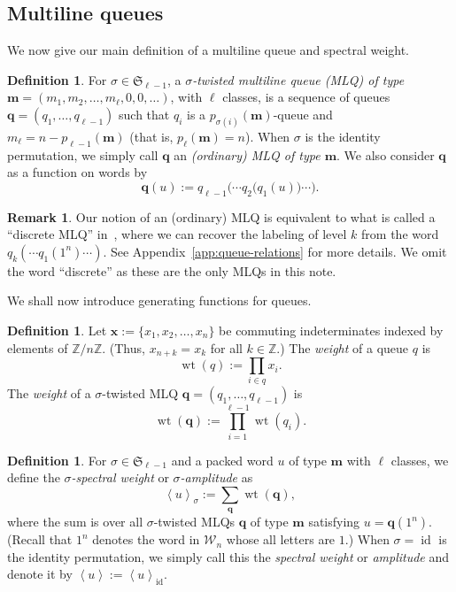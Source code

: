 \documentclass[reqno]{amsart}
\newcommand{\0}{\phantom{c}}
\newcommand{\swt}[1]{\left\langle #1 \right\rangle} %
\newcommand{\SymGp}[1]{\mathfrak{S}_{#1}} %
\DeclareMathOperator{\wt}{wt} %
\DeclareMathOperator{\id}{id} %
\newcommand{\mm}{\mathbf{m}}
\newcommand{\qq}{\mathbf{q}}
\newcommand{\xx}{\mathbf{x}}
\newcommand{\mcW}{\mathcal{W}}
\newcommand{\ZZ}{\mathbb{Z}}
\let\sumnonlimits\sum
\let\prodnonlimits\prod
\renewcommand{\sum}{\sumnonlimits\limits}
\renewcommand{\prod}{\prodnonlimits\limits}
\newcommand{\tup}[1]{\left( #1 \right)}
\newcommand{\defn}[1]{{\color{darkred}\emph{#1}}} %
\theoremstyle{plain}
\theoremstyle{definition}
\newtheorem{dfn}[thm]{Definition}
\newtheorem{remark}[thm]{Remark}
\numberwithin{equation}{section}
\begin{document}
\subsection{Multiline queues}

We now give our main definition of a multiline queue and spectral weight.

\begin{dfn}
For $\sigma \in \SymGp{\ell-1}$, a \defn{$\sigma$-twisted multiline queue (MLQ) of type $\mm = \tup{m_1, m_2, \ldots, m_\ell, 0, 0, \ldots}$}, with $\ell$ classes, is a sequence of queues $\qq = (q_1, \dotsc, q_{\ell-1})$ such that $q_i$ is a $p_{\sigma(i)}(\mm)$-queue and $m_{\ell} = n - p_{\ell-1}(\mm)$ (that is, $p_\ell(\mm) = n$).
When $\sigma$ is the identity permutation, we simply call $\qq$ an \defn{(ordinary) MLQ of type $\mm$}.
We also consider $\qq$ as a function on words by
\[
\qq(u) := q_{\ell-1}\bigl( \cdots q_2\bigl( q_1(u) \bigr) \cdots \bigr).
\]
\end{dfn}

\begin{remark}
Our notion of an (ordinary) MLQ is equivalent to what is called a ``discrete MLQ'' in~\cite[\S 2.2]{AasLin17}, where we can recover the labeling of level $k$ from the word $q_k( \cdots q_1(1^n) \cdots )$.
See Appendix~\ref{app:queue-relations} for more details.
We omit the word ``discrete'' as these are the only MLQs in this note.
\end{remark}

We shall now introduce generating functions for queues.

\begin{dfn}
Let $\xx := \{x_1, x_2, \ldots, x_n\}$ be commuting indeterminates indexed by elements of $\ZZ / n \ZZ$.
(Thus, $x_{n+k} = x_k$ for all $k \in \ZZ$.)
The \defn{weight} of a queue $q$ is
\[
  \wt(q) := \prod_{i \in q} x_i.
\]
The \defn{weight} of a $\sigma$-twisted MLQ $\qq = (q_1, \dotsc, q_{\ell-1})$ is
\[
  \wt(\qq) := \prod_{i=1}^{\ell-1} \wt(q_i).
\]
\end{dfn}

\begin{dfn}
For $\sigma \in \SymGp{\ell-1}$ and a packed word $u$ of type $\mm$ with $\ell$ classes, we define the \defn{$\sigma$-spectral weight} or \defn{$\sigma$-amplitude} as
\[
  \swt{u}_{\sigma} := \sum_{\qq} \wt(\qq),
\]
where the sum is over all $\sigma$-twisted MLQs $\qq$ of type $\mm$ satisfying $u = \qq(1^n)$.
(Recall that $1^n$ denotes the word in $\mcW_n$ whose all letters are $1$.)
When $\sigma = \id$ is the identity permutation, we simply call this the \defn{spectral weight} or \defn{amplitude} and denote it by $\swt{u} := \swt{u}_{\id}$.
\end{dfn}
\end{document}
